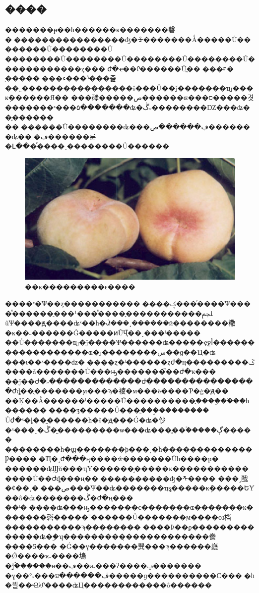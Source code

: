 \documentclass[a4paper,11pt,onecolumn,twoside]{article}
\begin{document}
\begin{CJK*}{GBK}{song}
\begin{multicols}{2}
\section{����}
����\supercite{Wu,Xuan}���ᵽ��һ������ĸ�������磬�󿪱����������������ʤ�ᡱ�������Ǻ�����Ů��������Ů��������Ů
��������Ů��������Ů��������Ů��������Ů������������ȥ���԰ժ�ҽ��ᡣ������Ůֱ��԰���ף�
ֻ�����԰���ء���ʿͬ���츮��˾����������������š���Ů��ǰ�������ҵȷ���ĸּܲ������Я��
���硣�����ص������ɶ���ס�����겻�������ˣ���۵�������ʥ�ڴ˶��������Ǳ���ʥ��֪������
��԰������Ů��������ʥ���ڣ������ص�������ʥ��԰�ڣ������룬�Լ���ͤ����˯��������Ů������
\begin{figure}
\centering
\includegraphics[width=12cm]{Pantao.jpg}
\caption{��ĸ���������ϵ����}\label{fig2}
\end{figure}
����ˣ�Ѱ��ȥ�����������󡣡����ؼ���ͬ����Ѱ����ͤ������ֻ���¹���ͤ����֪�����������ﶼ
ûѰ����ԭ����ʥˣ��һ�ᣬ���˼������ӣ��������糤�ĸ��˶������Ǵ�����ͷŨҶ֮��˯���ˡ�����
��Ů�������ҵȷ�ּǰ����Ѱ������ʥ�����ҿջأ������������������ɶ�ȷ�ּ�������س��ɡ��Ҵ�ʥ
���ι��ˣ����ǳ�԰����ȥ�ˡ������ȥժ�ң���������ػ����ǡ�������Ů���ԣ�������֮��ժ�ҡ���
��ǰ��ժ�˶�������������ժ����������������ժȡ��ֻ�������ϻ���ϡ�裬ֹ�м���ë����Ƥ�ġ�ԭ��
��Ķ��Ǻ������ˡ�����Ů����������ֻ����֦��ֹ��һ������׵����ӡ�����Ů���ֳ���֦��������
Ůժ�ˣ�ȴ��֦������һ�š�ԭ���Ǵ�ʥ�仯�ˣ���˯�ڴ�֦���������ѡ���ʥ���ֱ��࣬�����ڳ�����
��������һ�ϣ�������ϸ���͵�һ�������������Ƿ�����Ҵ�͵ժ���ң����ŵ�������Ůһ����µ�
������ʥϢŭ���ҵȲ������֣�����ĸ���������������Ů��ժȡ���ң��󿪱����������ʤ�ᡯ����
���˼䣬�ȼ��˱�԰���ص���Ѱ��ʥ�������ҵȿֳ�����ĸּܲ�����ԵȲ��ô�ʥ�������ڴ�ժ�ң���
��ˡ�����ʥ���ԣ�������ϲ�������ɶ�������ĸ�������磬�����˭������Ů�������ϻ����оɹ档
�����������ϡ��������޺����Ϸ��ϼ��������������ʥ�ۣ�ʮ���������̣������������飬����Ƽ���
�Ǵ��ɣ�������巽���ϡ������嶷�Ǿ����ϰ˶����塢�ĵۡ�̫�����ɵ��ڣ��а˶���ʡ����ݡ�������
�ɣ��°˶���ڤ������ע�����ɡ����������С���񣬾�һ�븰��Ҽλᡣ����ʥЦ������������ô������

\end{multicols}
\end{CJK*}
\end{document}
